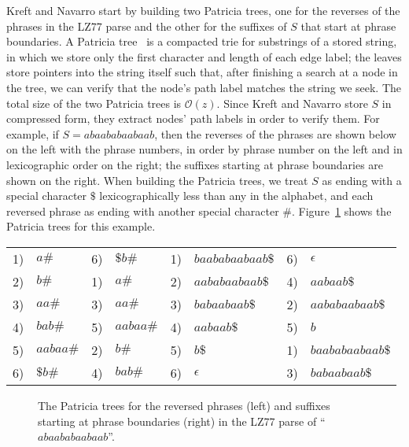 \documentclass[review]{elsarticle}
\newcommand{\Oh}[1]
    {\ensuremath{\mathcal{O}\!\left( {#1} \right)}}
\begin{document}
Kreft and Navarro start by building two Patricia trees, one for the reverses of the phrases in the LZ77 parse and the other for the suffixes of $S$ that start at phrase boundaries.  A Patricia tree~\cite{Mor68} is a compacted trie for substrings of a stored string, in which we store only the first character and length of each edge label; the leaves store pointers into the string itself such that, after finishing a search at a node in the tree, we can verify that the node's path label matches the string we seek.  The total size of the two Patricia trees is $\Oh{z}$.  Since Kreft and Navarro store $S$ in compressed form, they extract nodes' path labels in order to verify them.  For example, if \(S = abaababaabaab\), then the reverses of the phrases are shown below on the left with the phrase numbers, in order by phrase number on the left and in lexicographic order on the right; the suffixes starting at phrase boundaries are shown on the right.  When building the Patricia trees, we treat $S$ as ending with a special character $\$$ lexicographically less than any in the alphabet, and each reversed phrase as ending with another special character $\#$.  Figure~\ref{fig:Patricia} shows the Patricia trees for this example.
\begin{center}
\begin{tabular}{rl@{\hspace{3ex}}rl@{\hspace{8ex}}rl@{\hspace{3ex}}rl}
1) & \(a\#\) & 6) & \(\$b\#\) & 1) & \(baababaabaab\$\) & 6) & $\epsilon$\\
2) & \(b\#\) & 1) & \(a\#\) & 2) & \(aababaabaab\$\) & 4) & \(aabaab\$\)\\
3) & \(aa\#\) & 3) & \(aa\#\) & 3) & \(babaabaab\$\) & 2) & \(aababaabaab\$\)\\
4) & \(bab\#\) & 5) & \(aabaa\#\) & 4) & \(aabaab\$\) & 5) & $b$\\
5) & \(aabaa\#\) & 2) & \(b\#\) & 5) & \(b\$\) & 1) & \(baababaabaab\$\)\\
6) & \(\$b\#\) & 4) & \(bab\#\) & 6) & $\epsilon$ & 3) & \(babaabaab\$\)
\end{tabular}
\end{center}

\begin{figure}[t]
\begin{center}
\caption{The Patricia trees for the reversed phrases (left) and suffixes starting at phrase boundaries (right) in the LZ77 parse of ``\(abaababaabaab\)''.}
\label{fig:Patricia}
\end{center}
\end{figure}
\end{document}
